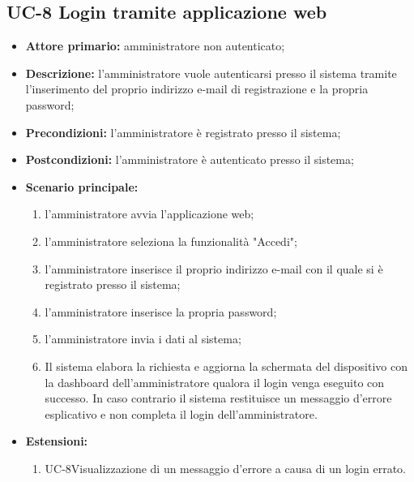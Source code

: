 \subsection{UC-8 Login tramite applicazione web}
\begin{itemize}
	\item \textbf{Attore primario:} amministratore non autenticato;

	\item \textbf{Descrizione:} l'amministratore vuole autenticarsi presso il sistema tramite l'inserimento del proprio indirizzo e-mail di registrazione e la propria password;

	\item \textbf{Precondizioni:} l'amministratore è registrato presso il sistema;

	\item \textbf{Postcondizioni:} l'amministratore è autenticato presso il sistema;

	\item \textbf{Scenario principale:}

	      \begin{enumerate}
		      \item l'amministratore avvia l'applicazione web;
		      \item l'amministratore seleziona la funzionalità "Accedi";
		      \item l'amministratore inserisce il proprio indirizzo e-mail con il quale si è registrato presso il sistema;
		      \item l'amministratore inserisce la propria password;
		      \item l'amministratore invia i dati al sistema;
		      \item Il sistema elabora la richiesta e aggiorna la schermata del dispositivo con la dashboard dell'amministratore qualora il login venga eseguito con successo. In caso contrario il sistema restituisce un messaggio d'errore esplicativo e non completa il login dell'amministratore.
	      \end{enumerate}
	\item \textbf{Estensioni:}
	      \begin{enumerate}
		      \item UC-8Visualizzazione di un messaggio d'errore a causa di un login errato.
	      \end{enumerate}
\end{itemize}

